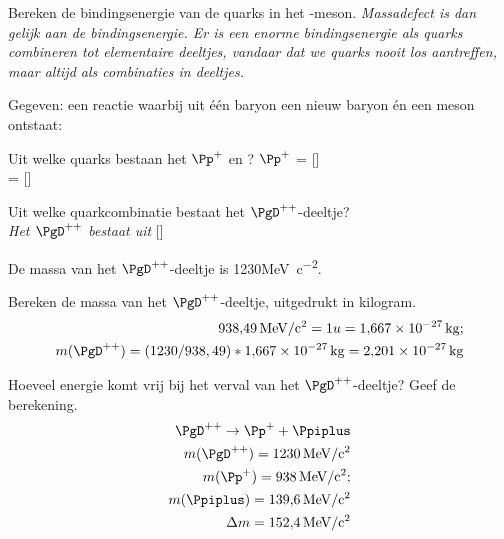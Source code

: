\begin{opdrachten}
\begin{opdrachten}
    \item Bereken de bindingsenergie van de quarks in het
    \Ppiplus-meson. \textit{ Massadefect is dan gelijk aan de
    bindingsenergie. Er is een enorme bindingsenergie als quarks
    combineren tot elementaire deeltjes, vandaar dat we quarks nooit los
    aantreffen, maar altijd als combinaties in deeltjes.}
    \end{opdrachten} 

\item Gegeven: een reactie waarbij uit één baryon een nieuw baryon én een meson ontstaat:
\ce{\PgD^{++} -> \Pp^+ + \Ppiplus }
    \begin{opdrachten} 
    \item  Uit welke quarks bestaan het $\Pp^+$ en \Ppiplus?    
    $\Pp^+$ = [\Pup\Pdown\Pdown] \\ \Ppiplus = [\Pup\APdown]
    
    \item Uit welke quarkcombinatie bestaat het $\PgD^{++}$-deeltje?\\
    \textit{ Het $\PgD^{++}$ bestaat uit }[\Pup\Pup\Pup]
    
    De massa van het $\PgD^{++}$-deeltje is 1230\si{MeV.c^{-2}}.
    \item Bereken de massa van het $\PgD^{++}$-deeltje, uitgedrukt in kilogram.
    \begin{eqnarray*} 
    \SI{938.49}{\mega\electronvolt\per c\squared}= 1 u = \SI{1.667e-27}{\kilo\gram} ; \\  
    m(\PgD^{++}) = (1230/938,49)* \SI{1.667e-27}{\kilo\gram} = \SI{2.201e-27}{\kilo\gram}
    \end{eqnarray*}    
    
    \item Hoeveel energie komt vrij bij het verval van het $\PgD^{++}$-deeltje?
    Geef de berekening.
    \begin{eqnarray*} 
    \PgD^{++} \rightarrow \Pp^+ + \Ppiplus \\
    m(\PgD^{++}) = \SI{1230}{\mega\electronvolt\per c\squared}  \\m(\Pp^+) = \SI{938}{\mega\electronvolt\per c\squared}; \\ 
    m(\Ppiplus) = \SI{139.6}{\mega\electronvolt\per c\squared} \\
    \Delta m = \SI{152.4}{\mega\electronvolt\per c\squared}    
    \end{eqnarray*} 
    \end{opdrachten}


\end{opdrachten}
